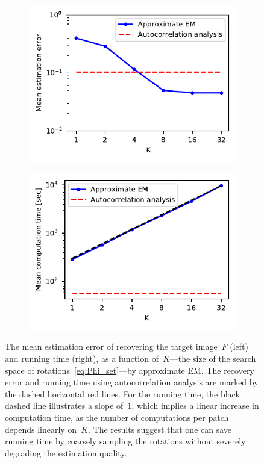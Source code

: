 \documentclass{article}
\begin{document}
\begin{figure}[!tb]
	\begin{subfigure}[ht]{\columnwidth}
		\centering
		\includegraphics[width=0.85\columnwidth]{figures/experiment_K_err.pdf}
	\end{subfigure}
	\hfill
	\begin{subfigure}[ht]{\columnwidth}
		\centering
		\includegraphics[width=0.85\columnwidth]{figures/experiment_K_time.pdf}
	\end{subfigure}
	\caption{The mean estimation error of recovering the target image~$F$ (left) and running time (right), as a function of~$K$---the size of the search space of rotations~\eqref{eq:Phi_set}---by approximate EM. The recovery error and running time using autocorrelation analysis are marked by the dashed horizontal red lines. For the running time, the black dashed line illustrates a slope of~$1$, which implies a linear increase in computation time, as the number of computations per patch depends linearly on~$K$. The results suggest that one can save running time by coarsely sampling  the rotations  without severely degrading  the estimation quality.}
\label{fig:discretization_experiment}
\end{figure}
\end{document}
